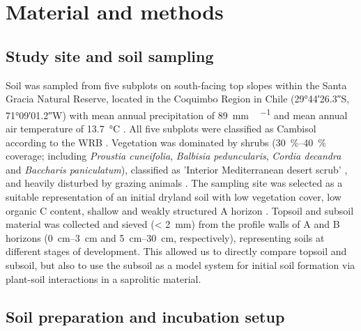 \section{Material and methods}
\subsection{Study site and soil sampling}

Soil was sampled from five subplots on south-facing top slopes within the Santa Gracia Natural Reserve, located in the Coquimbo Region in Chile (\ang{29;44;26.3}S, \ang{71;09;01.2}W) with mean annual precipitation of \SI{89}{\milli\metre\,\year^{-1}} and mean annual air temperature of \SI{13.7}{\degreeCelsius} \citep{MinisterioObrasPublicas2017}. All five subplots were classified as Cambisol according to the WRB \citep{IUSS2015}. Vegetation was dominated by shrubs (\SIrange{30}{40}{\percent} coverage; including \textit{Proustia cuneifolia}, \textit{Balbisia peduncularis}, \textit{Cordia decandra} and \textit{Baccharis paniculatum}), classified as 'Interior Mediterranean desert scrub' \citep{Luebert2006}, and heavily disturbed by grazing animals \citep{Oeser2018}. The sampling site was selected as a suitable representation of an initial dryland soil with low vegetation cover, low organic C content, shallow and weakly structured A horizon \citep{Bernhard2018}. Topsoil and subsoil material was collected and sieved (\SI{< 2}{\milli\metre}) from the profile walls of A and B horizons (\SIrange{0}{3}{\centi\metre} and \SIrange{5}{30}{\centi\metre}, respectively), representing soils at different stages of development. This allowed us to directly compare topsoil and subsoil, but also to use the subsoil as a model system for initial soil formation via plant-soil interactions in a saprolitic material.

\subsection{Soil preparation and incubation setup}

